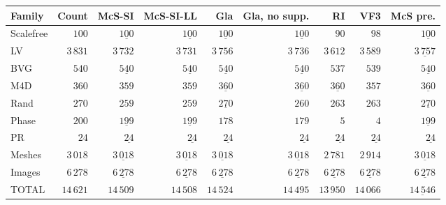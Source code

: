
\begin{tabular}{lrrrrrrrr}
    \toprule
    Family & Count & McS-SI & McS-SI-LL & Gla & Gla, no supp. & RI & VF3 & McS pre.\\
    \midrule

\rule{0pt}{2.3ex}Scalefree & $100$ & $\underline{100}$ & $\underline{100}$ & $\underline{100}$ & $\underline{100}$ & $90$ & $98$ & $\underline{100}$\\
\rule{0pt}{2.3ex}LV & $3\,831$ & $3\,732$ & $3\,731$ & $3\,756$ & $3\,736$ & $3\,612$ & $3\,589$ & $\underline{3\,757}$\\
\rule{0pt}{2.3ex}BVG & $540$ & $\underline{540}$ & $\underline{540}$ & $\underline{540}$ & $\underline{540}$ & $537$ & $539$ & $\underline{540}$\\
\rule{0pt}{2.3ex}M4D & $360$ & $359$ & $359$ & $\underline{360}$ & $\underline{360}$ & $\underline{360}$ & $357$ & $\underline{360}$\\
\rule{0pt}{2.3ex}Rand & $270$ & $259$ & $259$ & $\underline{270}$ & $260$ & $263$ & $263$ & $\underline{270}$\\
\rule{0pt}{2.3ex}Phase & $200$ & $\underline{199}$ & $\underline{199}$ & $178$ & $179$ & $5$ & $4$ & $\underline{199}$\\
\rule{0pt}{2.3ex}PR & $24$ & $\underline{24}$ & $\underline{24}$ & $\underline{24}$ & $\underline{24}$ & $\underline{24}$ & $\underline{24}$ & $\underline{24}$\\
\rule{0pt}{2.3ex}Meshes & $3\,018$ & $\underline{3\,018}$ & $\underline{3\,018}$ & $\underline{3\,018}$ & $\underline{3\,018}$ & $2\,781$ & $2\,914$ & $\underline{3\,018}$\\
\rule{0pt}{2.3ex}Images & $6\,278$ & $\underline{6\,278}$ & $\underline{6\,278}$ & $\underline{6\,278}$ & $\underline{6\,278}$ & $\underline{6\,278}$ & $\underline{6\,278}$ & $\underline{6\,278}$\\
\midrule
\rule{0pt}{2.3ex}TOTAL & $14\,621$ & $14\,509$ & $14\,508$ & $14\,524$ & $14\,495$ & $13\,950$ & $14\,066$ & $\underline{14\,546}$\\

    \bottomrule
\end{tabular}

